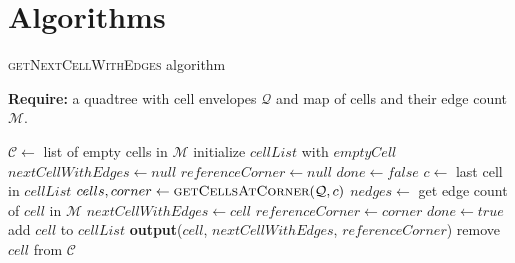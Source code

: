 \documentclass{article}
\begin{document}
    
    \section*{Algorithms}
    \begin{algorithm} \caption{\textsc{getNextCellWithEdges} algorithm}
        \textbf{Require:} a quadtree with cell envelopes $\mathcal Q$ and map of cells and their edge count $\mathcal M$.
        \begin{algorithmic}[1]
            \State $\mathcal C \gets $ list of empty cells in $\mathcal M$
                \State initialize $cellList$ with $emptyCell$ 
                \State $nextCellWithEdges \gets null$
                \State $referenceCorner \gets null$
                \State $done \gets false$
                    \State $c \gets $ last cell in $cellList$ 
                    \State $cells, corner \gets \textsc{getCellsAtCorner}(\mathcal Q, c)$ 
                        \State $nedges \gets$ get edge count of $cell$ in $\mathcal M$ 
                            \State $nextCellWithEdges \gets cell$
                            \State $referenceCorner \gets corner$
                            \State $done \gets true$
                        \Else
                            \State add $cell$ to $cellList$
                        \EndIf
                    \EndFor
                \EndWhile
                    \State \textbf{output}($cell$, $nextCellWithEdges$, $referenceCorner$)
                    \State remove $cell$ from $\mathcal C$
                \EndFor
            \EndFor
        \EndFunction
        \end{algorithmic}
    \end{algorithm}
    
\end{document}
